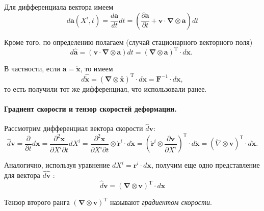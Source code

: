 Для дифференциала вектора имеем 
\begin{equation*}
d \mathbf{a}\left(X^{i}, t\right)=\frac{d \mathbf{a}}{d t} d t=\left(\frac{\partial \mathbf{a}}{\partial t}+\mathbf{v} \cdot \boldsymbol{\nabla} \otimes \mathbf{a}\right) d t
\end{equation*}

Кроме того, по определению полагаем (случай стационарного векторного поля)
\begin{equation*}
d \hat{\mathbf{a}}=(\mathbf{v} \cdot \boldsymbol{\nabla} \otimes \mathbf{a}) d t=(\boldsymbol{\nabla} \otimes \mathbf{a})^{\mathrm{T}} \cdot d \mathbf{x} \text {. }
\end{equation*}


В частности, если $\mathbf{a}=\mathring{\mathbf{x}}$, то имеем
\begin{equation*}
d \widehat{\mathring{\mathbf{x}}}=(\boldsymbol{\nabla} \otimes
\stackrel{\circ}{\mathbf{x}})^{\mathrm{T}} \cdot d \mathbf{x}=\mathbf{F}^{-1}
\cdot d \mathbf{x},
\end{equation*}
то есть получили тот же дифференциал, что использовали ранее.

\paragraph{Градиент скорости и тензор скоростей деформации.} Рассмотрим дифференциал вектора скорости $\widehat{d}
\mathbf{v}$: 
\[
  \hat{d}\mathbf{v} = \frac{\partial}{\partial t} d\mathbf{x} = \frac{\partial^2
  \mathbf{x}}{\partial X^i \partial t} dX^i = \frac{\partial^2
\mathbf{x}}{\partial X^i \partial t}\otimes \mathring{\mathbf{r}}^i\cdot
d\mathring{\mathbf{x}} = \left( \mathring{\mathbf{r}}^i\otimes \frac{\partial
\mathbf{v}}{\partial X^i} \right)^{\mathsf T} \cdot d\mathring{\mathbf{x}} =
(\mathring{\nabla}\otimes\mathbf{v})^{\mathsf T} \cdot d\mathring{\mathbf{x}}.
\]

Аналогично, используя уравнение $d X^{i}=\mathbf{r}^{i} \cdot
d \mathbf{x}$, получим еще одно представление для вектора $\widehat{d \mathbf{v}}$ :
\begin{equation*}
\widehat{d} \mathbf{v}=(\boldsymbol{\nabla} \otimes \mathbf{v})^{\mathrm{T}} \cdot d \mathbf{x} 
\end{equation*}

\begin{definition*}
Тензор второго ранга $(\boldsymbol{\nabla} \otimes \mathbf{v})^{\mathrm{T}}$
называют \emph{градиентом скорости}.
\end{definition*}

